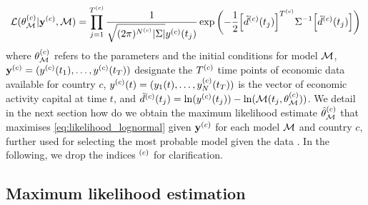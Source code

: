 \begin{equation}\label{eq:likelihood_lognormal}
  \mathcal{L}(\theta^{(c)}_{\mathcal{M}} | {\textbf{y}^{(c)} }, \mathcal{M}) = \prod_{j=1}^{T^{(c)}} \frac{1}{\sqrt{(2\pi)^{N^{(c)}}|\Sigma|} y^{(c)}(t_j)} \exp \left(-\frac{1}{2} \Big[ \tilde{d}^{(c)}(t_j)\Big]^{T^{(c)}} \Sigma^{-1} \Big[ \tilde{d}^{(c)}(t_j)\Big] \right)
\end{equation}
% 
where $\theta^{(c)}_{\mathcal{M}}$ refers to the parameters and the initial conditions for model $\mathcal{M}$, $\textbf{y}^{(c)} = (y^{(c)}(t_1), \dots, y^{(c)}(t_T))$  designate the $T^{(c)}$ time points of economic data available for country $c$, $ y^{(c)}(t) = (y_1(t), \dots, y^{(c)}_N(t_T))$ is the vector of economic activity capital at time $t$, and $\tilde{d}^{(c)}(t_j) = \ln(y^{(c)}(t_j)) - \ln(\mathcal{M}(t_j,\theta^{(c)}_{\mathcal{M}}))$. 
% 
We detail in the next section how do we obtain the maximum likelihood estimate $\hat\theta^{(c)}_{\mathcal{M}}$ that maximises \cref{eq:likelihood_lognormal} given $\textbf{y}^{(c)}$ for each model $\mathcal{M}$ and country $c$, further used for selecting the most probable model given the data \cite{Burnham2002}. In the following, we drop the indices $^{(c)}$ for clarification.

\subsection{Maximum likelihood estimation}\label{parameter-inference}

